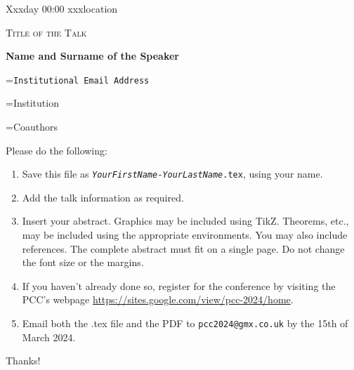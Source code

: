 \documentclass[12pt,a4paper]{article}
\newcommand{\TalkTimeLocation}{Xxxday 00:00 xxxlocation}
\newcommand{\ifEmpty}[3]{\setbox0=\hbox{#1\unskip}\ifdim\wd0=0pt{#2}\else{#3}\fi}
\newcommand{\nothingIfEmpty}[2]{\ifEmpty{#1}{}{#2}}
\newcommand{\showIfNotEmpty}[1]{\nothingIfEmpty{#1}{#1}}
\newcommand{\showTalkJointWork}[1]{\nothingIfEmpty{#1}{(This talk is based on joint work with (#1).)}}
\newcommand{\TalkTitle}{Title of the Talk}
\newcommand{\TalkPresenter}{Name and Surname of the Speaker}
\newcommand{\TalkEmail}{Institutional Email Address}
\newcommand{\TalkAffiliation}{Institution}
\newcommand{\TalkJointWork}{Coauthors}     %
\begin{document}
\hfill \textsf{\TalkTimeLocation}
\begin{center}
 {\Large\textsc{\TalkTitle}}

 \textbf{\TalkPresenter}

 \showIfNotEmpty{\texttt{\TalkEmail}}

 \showIfNotEmpty{\TalkAffiliation}

 \showTalkJointWork{\TalkJointWork}

 \bigskip\bigskip
\end{center}



Please do the following:
\begin{enumerate}
\item Save this file as \texttt{\emph{YourFirstName}-\emph{YourLastName}.tex}, using your name.
\item Add the talk information as required. 
\item Insert your abstract. Graphics may be included using TikZ. Theorems, etc., may be included using the appropriate environments. You may also include references. The complete abstract must fit on a single page. Do not change the font size or the margins.
\item If you haven't already done so, register for the conference by visiting the PCC's webpage \url{https://sites.google.com/view/pcc-2024/home}.
\item Email both the .tex file and the PDF to \texttt{pcc2024@gmx.co.uk} by the 15th of March 2024.
\end{enumerate}
Thanks!









\end{document}
